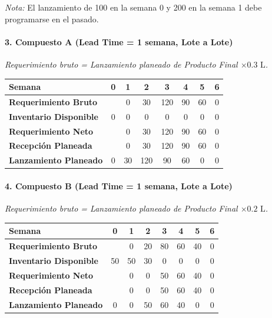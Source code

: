 \documentclass[
]{article}
\begin{document}
\emph{Nota:} El lanzamiento de 100 en la semana 0 y 200 en la semana 1
debe programarse en el pasado.

\hypertarget{compuesto-a-lead-time-1-semana-lote-a-lote}{%
\paragraph{3. Compuesto A (Lead Time = 1 semana, Lote a
Lote)}\label{compuesto-a-lead-time-1-semana-lote-a-lote}}

\emph{Requerimiento bruto = Lanzamiento planeado de Producto Final
\(\times 0.3\text{ L}\).}

\begin{longtable}[]{@{}lccccccc@{}}
\toprule\noalign{}
Semana & 0 & 1 & 2 & 3 & 4 & 5 & 6 \\
\midrule\noalign{}
\endhead
\bottomrule\noalign{}
\endlastfoot
\textbf{Requerimiento Bruto} & & 0 & 30 & 120 & 90 & 60 & 0 \\
\textbf{Inventario Disponible} & 0 & 0 & 0 & 0 & 0 & 0 & 0 \\
\textbf{Requerimiento Neto} & & 0 & 30 & 120 & 90 & 60 & 0 \\
\textbf{Recepción Planeada} & & 0 & 30 & 120 & 90 & 60 & 0 \\
\textbf{Lanzamiento Planeado} & 0 & 30 & 120 & 90 & 60 & 0 & 0 \\
\end{longtable}

\hypertarget{compuesto-b-lead-time-1-semana-lote-a-lote}{%
\paragraph{4. Compuesto B (Lead Time = 1 semana, Lote a
Lote)}\label{compuesto-b-lead-time-1-semana-lote-a-lote}}

\emph{Requerimiento bruto = Lanzamiento planeado de Producto Final
\(\times 0.2\text{ L}\).}

\begin{longtable}[]{@{}lccccccc@{}}
\toprule\noalign{}
Semana & 0 & 1 & 2 & 3 & 4 & 5 & 6 \\
\midrule\noalign{}
\endhead
\bottomrule\noalign{}
\endlastfoot
\textbf{Requerimiento Bruto} & & 0 & 20 & 80 & 60 & 40 & 0 \\
\textbf{Inventario Disponible} & 50 & 50 & 30 & 0 & 0 & 0 & 0 \\
\textbf{Requerimiento Neto} & & 0 & 0 & 50 & 60 & 40 & 0 \\
\textbf{Recepción Planeada} & & 0 & 0 & 50 & 60 & 40 & 0 \\
\textbf{Lanzamiento Planeado} & 0 & 0 & 50 & 60 & 40 & 0 & 0 \\
\end{longtable}
\end{document}
